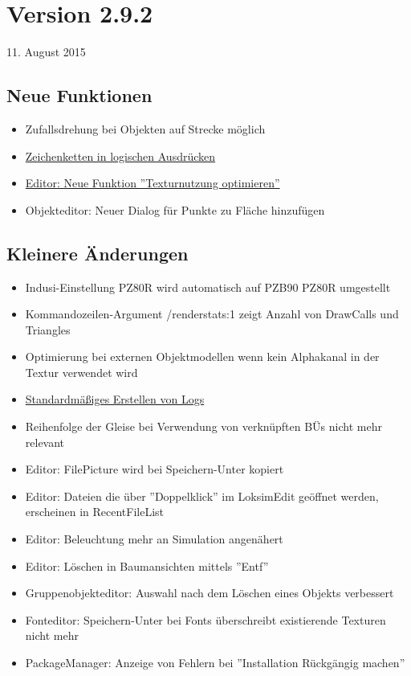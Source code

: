 \section{Version 2.9.2}\hfill 11. August 2015
\subsection{Neue Funktionen}
\begin{itemize}
\item Zufallsdrehung bei Objekten auf Strecke möglich
\item \hyperref[sec.editor.obj.logischeausdruecke]{Zeichenketten in logischen Ausdrücken}
\item \hyperref[sec:editor-texturnutzung-optimieren]{Editor: Neue Funktion ''Texturnutzung optimieren''}
\item Objekteditor: Neuer Dialog für Punkte zu Fläche hinzufügen
\end{itemize}

\subsection{Kleinere Änderungen}
\begin{itemize}
\item Indusi-Einstellung PZ80R wird automatisch auf PZB90 PZ80R umgestellt
\item Kommandozeilen-Argument /renderstats:1 zeigt Anzahl von DrawCalls und Triangles
\item Optimierung bei externen Objektmodellen wenn kein Alphakanal in der Textur verwendet wird
\item \hyperref[sec:editor-logging]{Standardmäßiges Erstellen von Logs}
\item Reihenfolge der Gleise bei Verwendung von verknüpften BÜs nicht mehr relevant
\item Editor: FilePicture wird bei Speichern-Unter kopiert
\item Editor: Dateien die über ''Doppelklick'' im LoksimEdit geöffnet werden, erscheinen in RecentFileList
\item Editor: Beleuchtung mehr an Simulation angenähert
\item Editor: Löschen in Baumansichten mittels ''Entf''
\item Gruppenobjekteditor: Auswahl nach dem Löschen eines Objekts verbessert
\item Fonteditor: Speichern-Unter bei Fonts überschreibt existierende Texturen nicht mehr
\item PackageManager: Anzeige von Fehlern bei ''Installation Rückgängig machen''
\end{itemize}


